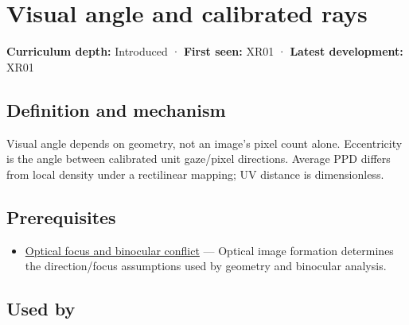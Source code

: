 \hypertarget{appendix-7d356c396d1a}{}\label{referencestart:appendix-7d356c396d1a}
\section{Visual angle and calibrated rays}\label{appendix-7d356c396d1a-visual-angle-and-calibrated-rays}

\hypertarget{appendix-7d356c396d1a-visual-angle-and-calibrated-rays}{}

\textbf{Curriculum depth:} Introduced · \textbf{First seen:} XR01 · \textbf{Latest development:} XR01

\begin{allmightroledefinition}

\subsection{Definition and mechanism}\label{appendix-7d356c396d1a-definition-and-mechanism}

\hypertarget{appendix-7d356c396d1a-definition-and-mechanism}{}

Visual angle depends on geometry, not an image's pixel count alone. Eccentricity is the angle between calibrated unit gaze/pixel directions. Average PPD differs from local density under a rectilinear mapping; UV distance is dimensionless.

\end{allmightroledefinition}

\subsection{Prerequisites}\label{appendix-7d356c396d1a-prerequisites}

\hypertarget{appendix-7d356c396d1a-prerequisites}{}

\begin{itemize}
\tightlist
\item
  \hyperref[appendix-f90cee1be7a4]{Optical focus and binocular conflict} --- Optical image formation determines the direction/focus assumptions used by geometry and binocular analysis.
\end{itemize}

\subsection{Used by}\label{appendix-7d356c396d1a-used-by}

\hypertarget{appendix-7d356c396d1a-used-by}{}


